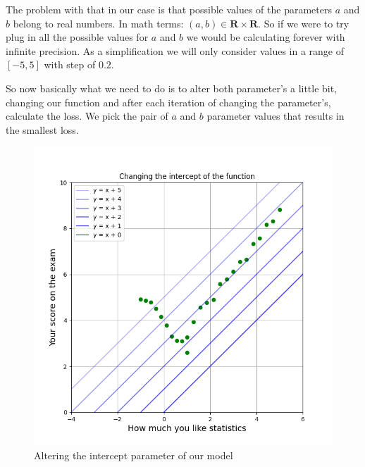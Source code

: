 \documentclass{article}
\begin{document}
The problem with that in our case is that possible values of the parameters $a$ and $b$ belong to real numbers. In math terms: $(a, b) \in \mathbf{R}\times\mathbf{R}$. So if we were to try plug in all the possible values for $a$ and $b$ we would be calculating forever with infinite precision. As a simplification we will only consider values in a range of $[-5,5]$ with step of $0.2$.

So now basically what we need to do is to alter both parameter's a little bit, changing our function and after each iteration of changing the parameter's, calculate the loss. We pick the pair of $a$ and $b$ parameter values that results in the smallest loss.

\begin{figure}[h]
    \centering
    \begin{minipage}{0.4\textwidth}
        \centering
        \includegraphics[width=\linewidth]{../images/myplot2.png}
        \caption{Altering the intercept parameter of our model}
    \end{minipage}
    \hfill
    \begin{minipage}{0.4\textwidth}
        \centering

\end{minipage}
\end{figure}
\end{document}

